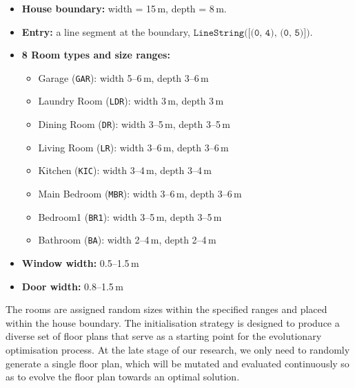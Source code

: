 \documentclass[]{article}
\begin{document}
\begin{itemize}
    \item \textbf{House boundary:} width = 15\,m, depth = 8\,m.
    \item \textbf{Entry:} a line segment at the boundary, $\texttt{LineString([(0, 4), (0, 5)])}$.
    \item \textbf{8 Room types and size ranges:}
          \begin{itemize}
              \item Garage (\texttt{GAR}): width 5--6\,m, depth 3--6\,m
              \item Laundry Room (\texttt{LDR}): width 3\,m, depth 3\,m
              \item Dining Room (\texttt{DR}): width 3--5\,m, depth 3--5\,m
              \item Living Room (\texttt{LR}): width 3--6\,m, depth 3--6\,m
              \item Kitchen (\texttt{KIC}): width 3--4\,m, depth 3--4\,m
              \item Main Bedroom (\texttt{MBR}): width 3--6\,m, depth 3--6\,m
              \item Bedroom1 (\texttt{BR1}): width 3--5\,m, depth 3--5\,m
              \item Bathroom (\texttt{BA}): width 2--4\,m, depth 2--4\,m
          \end{itemize}
    \item \textbf{Window width:} 0.5--1.5\,m
    \item \textbf{Door width:} 0.8--1.5\,m
\end{itemize}

The rooms are assigned random sizes within the specified ranges and placed within the house boundary. The initialisation strategy is designed to produce a diverse set of floor plans that serve as a starting point for the evolutionary optimisation process. At the late stage of our research, we only need to randomly generate a single floor plan, which will be mutated and evaluated continuously so as to evolve the floor plan towards an optimal solution.
\end{document}
